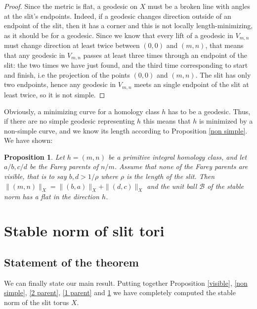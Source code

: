 \documentclass{article}
\newcommand{\Bb}{\mathcal{B}}
\newcommand{\St}[1]{\|#1\|_X}
\newtheorem{prop}[thm]{Proposition}
\theoremstyle{definition}
\begin{document}
\begin{proof}
    Since the metric is flat, a geodesic on $X$ must be a broken line with angles at the slit's endpoints. Indeed, if a geodesic changes direction outside of an endpoint of the slit, then it has a corner and this is not locally length-minimizing, as it should be for a geodesic. Since we know that every lift of a geodesic in $V_{m,n}$ must change direction at least twice between $(0,0)$ and $(m,n)$, that means that any geodesic in $V_{m,n}$ passes at least three times through an endpoint of the slit: the two times we have just found, and the third time corresponding to start and finish, i.e the projection of the points $(0,0)$ and $(m,n)$. The slit has only two endpoints, hence any geodesic in $V_{m,n}$ meets an single endpoint of the slit at least twice, so it is not simple.
\end{proof}

Obviously, a minimizing curve for a homology class $h$ has to be a geodesic. Thus, if there are no simple geodesic representing $h$ this means that $h$ is minimized by a non-simple curve, and we know its length according to Proposition \ref{non simple}.
We have shown:

\begin{prop}\label{0 parent}
    Let $h=(m,n)$ be a primitive integral homology class, and let $a/b,c/d$ be the Farey parents of $n/m$. Assume that none of the Farey parents are visible, that is to say $b,d> 1/\rho$ where $\rho$ is the length of the slit. Then $\St{(m,n)}=\St{(b,a)} + \St{(d,c)}$ and the unit ball $\Bb$ of the stable norm has a flat in the direction $h$.
\end{prop}








\section{Stable norm of slit tori}
\subsection{Statement of the theorem}



We can finally state our main result. Putting together Proposition \ref{visible}, \ref{non simple}, \ref{2 parent}, \ref{1 parent} and \ref{0 parent} we have completely computed the stable norm of the slit torus $X$.
\end{document}

